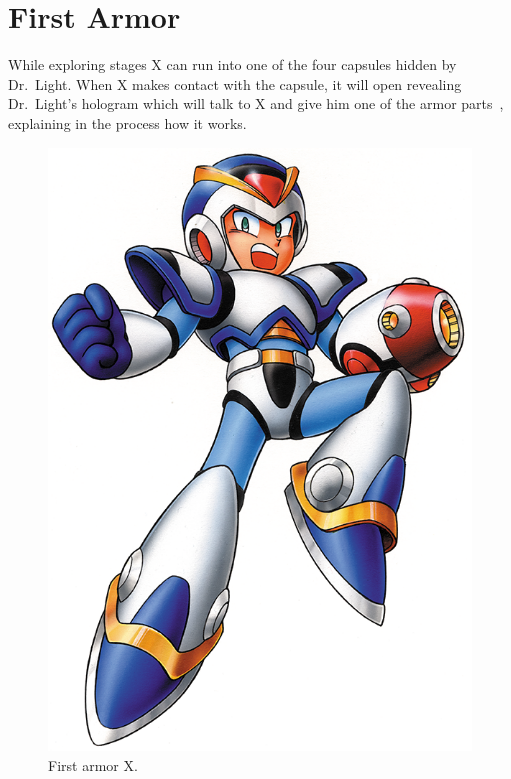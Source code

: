 \section{First Armor}\label{X1:Armor}

While exploring stages X can run into one of the four capsules hidden by Dr.~Light. When X makes contact with the capsule, it will open revealing Dr.~Light's hologram which will talk to X and give him one of the armor parts~\cite{wiki:First_armor}, explaining in the process how it works.
\begin{figure}[htp]
	\centering
	\includegraphics[width=0.2\linewidth]{figures/X1/First_armor.png}
	\caption{First armor X.}
\end{figure}

